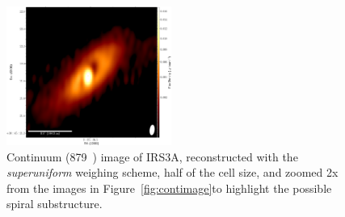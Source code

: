 \begin{figure}[H]
  \begin{center}
   \includegraphics[width=0.48\textwidth]{img/L1448IRS3B-cont-irs3a-highres.pdf} %
   \end{center}
   \caption{Continuum (879~\micron) image of IRS3A, reconstructed with the \textit{superuniform} weighing scheme, half of the cell size, and zoomed 2x from the images in Figure~\ref{fig:contimage}\space to highlight the possible spiral substructure.} \label{fig:widesuperuniform}
\end{figure}





